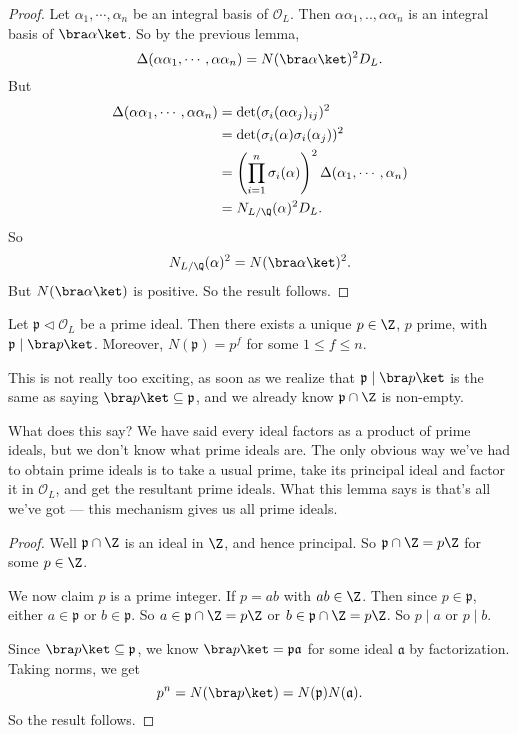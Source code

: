 \documentclass[a4paper]{article}
\begin{document}
\begin{proof}
  Let $\alpha_1, \cdots, \alpha_n$ be an integral basis of $\mathcal{O}_L$. Then $\alpha\alpha_1, .., \alpha\alpha_n$ is an integral basis of $\bra \alpha\ket$. So by the previous lemma,
  \[
    \Delta(\alpha \alpha_1, \cdots, \alpha\alpha_n) = N(\bra \alpha\ket)^2 D_L.
  \]
  But
  \begin{align*}
    \Delta (\alpha \alpha_1, \cdots, \alpha\alpha_n) &= \det(\sigma_i(\alpha\alpha_j)_{ij})^2 \\
    &= \det(\sigma_i(\alpha)\sigma_i(\alpha_j))^2\\
    &= \left(\prod_{i = 1}^n \sigma_i(\alpha)\right)^2 \Delta(\alpha_1, \cdots, \alpha_n)\\
    &= N_{L/\Q}(\alpha)^2 D_L.
  \end{align*}
  So
  \[
    N_{L/\Q}(\alpha)^2 = N(\bra \alpha\ket)^2.
  \]
  But $N(\bra \alpha\ket)$ is positive. So the result follows.
\end{proof}

\begin{lemma}
  Let $\mathfrak{p} \lhd \mathcal{O}_L$ be a prime ideal. Then there exists a unique $p \in \Z$, $p$ prime, with $\mathfrak{p} \mid \bra p\ket$. Moreover, $N(\mathfrak{p}) = p^f$ for some $1 \leq f \leq n$.
\end{lemma}
This is not really too exciting, as soon as we realize that $\mathfrak{p} \mid \bra p\ket$ is the same as saying $\bra p\ket \subseteq \mathfrak{p}$, and we already know $\mathfrak{p} \cap \Z$ is non-empty.

What does this say? We have said every ideal factors as a product of prime ideals, but we don't know what prime ideals are. The only obvious way we've had to obtain prime ideals is to take a usual prime, take its principal ideal and factor it in $\mathcal{O}_L$, and get the resultant prime ideals. What this lemma says is that's all we've got --- this mechanism gives us all prime ideals.

\begin{proof}
  Well $\mathfrak{p} \cap \Z$ is an ideal in $\Z$, and hence principal. So $\mathfrak{p} \cap \Z = p\Z$ for some $p \in \Z$.

  We now claim $p$ is a prime integer. If $p = ab$ with $ab \in \Z$. Then since $p \in \mathfrak{p}$, either $a \in \mathfrak{p}$ or $b \in \mathfrak{p}$. So $a \in \mathfrak{p} \cap \Z = p\Z$ or $b \in \mathfrak{p} \cap \Z = p\Z$. So $p \mid a$ or $p \mid b$.

  Since $\bra p\ket \subseteq \mathfrak{p}$, we know $\bra p\ket = \mathfrak{p}\mathfrak{a}$ for some ideal $\mathfrak{a}$ by factorization. Taking norms, we get
  \[
    p^n = N(\bra p\ket) = N(\mathfrak{p}) N(\mathfrak{a}).
  \]
  So the result follows.
\end{proof}
\end{document}
